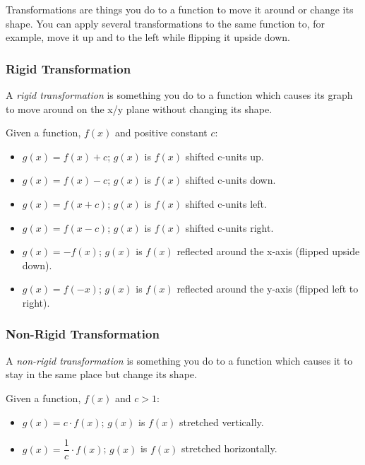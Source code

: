 \documentclass[fleqn,addpoints]{exam}
\begin{document}
Transformations are things you do to a function to move it around or change its shape.  You can apply several
transformations to the same function to, for example, move it up and to the left while flipping it upside down.

\subsubsection{Rigid Transformation}

A {\em rigid transformation} is something you do to a function which causes its graph to move around on the x/y plane
without changing its shape.

Given a function, $f(x)$ and positive constant $c$:

\begin{itemize}

\item $g(x) = f(x) + c$;  $g(x)$ is $f(x)$ shifted c-units up.
\item $g(x) = f(x) - c$;  $g(x)$ is $f(x)$ shifted c-units down.
\item $g(x) = f(x+c)$;  $g(x)$ is $f(x)$ shifted c-units left.
\item $g(x) = f(x-c)$;  $g(x)$ is $f(x)$ shifted c-units right.
\item $g(x) = -f(x)$;  $g(x)$ is $f(x)$ reflected around the x-axis (flipped upside down).
\item $g(x) = f(-x)$;  $g(x)$ is $f(x)$ reflected around the y-axis (flipped left to right).

\end{itemize}

\subsubsection{Non-Rigid Transformation}

A {\em non-rigid transformation} is something you do to a function which causes it to stay in the same place but
change its shape.

Given a function, $f(x)$ and $c > 1$:

\begin{itemize}

\item $g(x) = c \cdot f(x)$;  $g(x)$ is $f(x)$ stretched vertically.
\item $g(x) = \dfrac{1}{c} \cdot f(x)$;  $g(x)$ is $f(x)$ stretched horizontally.

\end{itemize}
\end{document}
